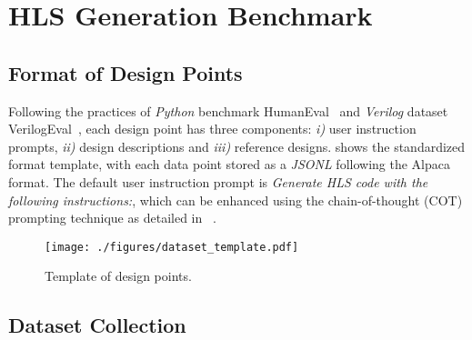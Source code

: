 
\section{HLS Generation Benchmark}
\label{subsec:benchmark}


\subsection{Format of Design Points}\label{subsec:benchmark_format}
Following the practices of \textit{Python} benchmark HumanEval~\cite{chen2021evaluating} and \textit{Verilog} dataset VerilogEval~\cite{liu2023verilogeval},
each design point has three components: \textit{i)} user instruction prompts, \textit{ii)} design descriptions and \textit{iii)} reference designs. 
 shows the standardized format template,  with each data point stored as a \textit{JSONL} following the Alpaca format.
The default user instruction prompt is \textit{Generate HLS code with the following instructions:}, which can be enhanced using the chain-of-thought (COT) prompting technique as detailed in ~.

\begin{figure}[bt]
\centering
\texttt{[image: ./figures/dataset\_template.pdf]}
\vspace{-2mm}
\caption{Template of design points.}
\vspace{-5mm}
\label{fig:dataset_template}
\end{figure}


\subsection{Dataset Collection}\label{subsec:benchmark_dataset}

